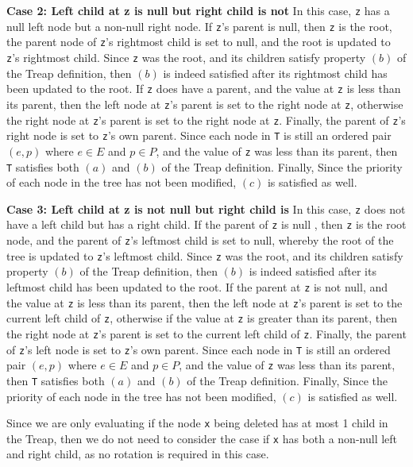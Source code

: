 \documentclass[12pt]{article}
\newenvironment{problem}[2][Problem]{\begin{trivlist}
\item[\hskip \labelsep {\bfseries #1}\hskip \labelsep {\bfseries #2.}]}{\end{trivlist}}
\begin{document}
\begin{problem}{6}
\noindent
\textbf{Case 2: Left child at z is null but right child is not} \newline
In this case, \texttt{z} has a null left node but a non-null right node. If \texttt{z}’s parent is null, then \texttt{z} is the root, the parent node of \texttt{z}’s rightmost child is set to null,
and the root is updated to \texttt{z}’s rightmost child. Since \texttt{z} was the root, and its children satisfy property $(b)$ of the Treap definition, then $(b)$ is indeed satisfied
after its rightmost child has been updated to the root. If \texttt{z} does have a parent, and the value at \texttt{z} is less than its parent, then the left node at \texttt{z}’s parent is set
to the right node at \texttt{z}, otherwise the right node at \texttt{z}’s parent is set to the right node at \texttt{z}. Finally, the parent of \texttt{z}’s right node is set to \texttt{z}’s own parent. Since
each node in \texttt{T} is still an ordered pair $(e, p)$ where $e \in E$ and $p \in P$, and the value of \texttt{z} was less than its parent, then \texttt{T} satisfies both $(a)$ and $(b)$ of the Treap definition.
Finally, Since the priority of each node in the tree has not been modified, $(c)$ is satisfied as well. \newline

\noindent
\textbf{Case 3: Left child at z is not null but right child is} \newline
In this case, \texttt{z} does not have a left child but has a right child. If the parent of \texttt{z} is null , then \texttt{z} is the root node, and the parent of \texttt{z}’s leftmost child is set
to null, whereby the root of the tree is updated to \texttt{z}’s leftmost child. Since \texttt{z} was the root, and its children satisfy property $(b)$ of the Treap definition, then $(b)$
is indeed satisfied after its leftmost child has been updated to the root. If the parent at \texttt{z} is not null, and the value at \texttt{z} is less than its parent, then the left
node at \texttt{z}’s parent is set to the current left child of \texttt{z}, otherwise if the value at \texttt{z} is greater than its parent, then the right node at \texttt{z}’s parent is set to the
current left child of \texttt{z}. Finally, the parent of \texttt{z}’s left node is set to \texttt{z}’s own parent. Since each node in \texttt{T} is still an ordered pair $(e, p)$ where $e \in E$ and $p \in P$, and the
value of \texttt{z} was less than its parent, then \texttt{T} satisfies both $(a)$ and $(b)$ of the Treap definition. Finally, Since the priority of each node in the tree has not been
modified, $(c)$ is satisfied as well. \newline

\noindent
Since we are only evaluating if the node \texttt{x} being deleted has at most 1 child in the Treap, then we do not need to consider the case if \texttt{x} has both a non-null left and
right child, as no rotation is required in this case.

\end{problem}
\end{document}
